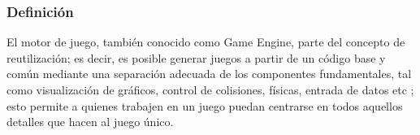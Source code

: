 \subsubsection{Definición}
El motor de juego, también conocido como Game Engine, parte del concepto de reutilización; es decir, es posible generar juegos a partir de un código base y común mediante una separación adecuada de los componentes fundamentales, tal como visualización de gráficos, control de colisiones, físicas, entrada de datos etc \cite{Ref:MutorGraf}; esto permite a quienes trabajen en un juego puedan centrarse en todos aquellos detalles que hacen al juego único.
\\
\par	
